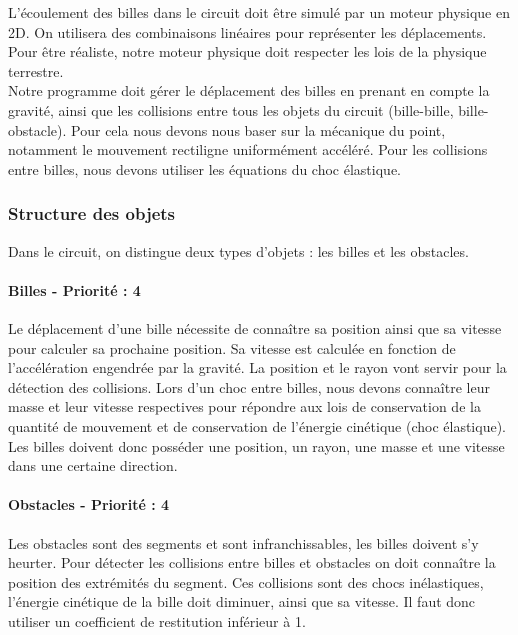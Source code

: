\documentclass{report}
\begin{document}
L’écoulement des billes dans le circuit doit être simulé par un moteur physique en 2D. On utilisera des combinaisons linéaires pour représenter les déplacements. Pour être réaliste, notre moteur physique doit respecter les lois de la physique terrestre. \\

Notre programme doit gérer le déplacement des billes en prenant en compte la gravité, ainsi que les collisions entre tous les objets du circuit (bille-bille, bille-obstacle). Pour cela nous devons nous baser sur la mécanique du point, notamment le mouvement rectiligne uniformément accéléré. Pour les collisions entre billes, nous devons utiliser les équations du choc élastique. 


\subsubsection{Structure des objets}

Dans le circuit, on distingue deux types d’objets : les billes et les obstacles.


\paragraph{Billes - Priorité : 4}

Le déplacement d’une bille nécessite de connaître sa position ainsi que sa vitesse pour calculer sa prochaine position. Sa vitesse est calculée en fonction de l’accélération engendrée par la gravité. La position et le rayon vont servir pour la détection des collisions. Lors d’un choc entre billes, nous devons connaître leur masse et leur vitesse respectives pour répondre aux lois de conservation de la quantité de mouvement et de conservation de l’énergie cinétique (choc élastique). Les billes doivent donc posséder une position, un rayon, une masse et une vitesse dans une certaine direction.

\paragraph{Obstacles - Priorité : 4}

Les obstacles sont des segments et sont infranchissables, les billes doivent s'y heurter. Pour détecter les collisions entre billes et obstacles on doit connaître la position des extrémités du segment. Ces collisions sont des chocs inélastiques, l’énergie cinétique de la bille doit diminuer, ainsi que sa vitesse. Il faut donc utiliser un coefficient de restitution inférieur à 1.
\end{document}

